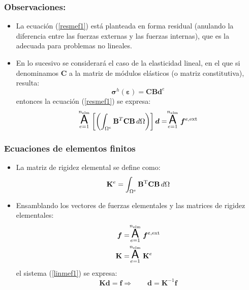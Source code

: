 \documentclass[handout]{beamer}
\begin{document}
\begin{frame}
\frametitle{Observaciones:}
\begin{itemize}
\item La ecuación (\ref{resmef1}) está planteada en forma
residual (anulando la diferencia entre las fuerzas externas y las fuerzas
internas), que es la adecuada para problemas no lineales.
\item En lo sucesivo se considerará el caso de la elasticidad lineal, en el
que si denominamos $\mathbf{C}$ a la matriz de módulos elásticos 
(o matriz constitutiva), resulta:
\begin{equation}
\bm{\sigma}^h(\bm{\varepsilon})=
\mathbf{C} \mathbf{B}\bm{d}^e
\end{equation}
entonces la ecuación (\ref{resmef1}) se expresa:
\begin{equation}
\stackrel{n_{\textrm{elm}}}{\underset{e=1}{\mbox{\LARGE{\bf {\sf A}}}}} \left[
\left(\int_{\Omega^e} \mathbf{B}^T \mathbf{C} \mathbf{B} \, d \Omega \right)
\right]\bm{d}=
\stackrel{n_{\textrm{elm}}}{\underset{e=1}{\mbox{\LARGE{\bf {\sf A}}}}}
\bm{f}^{e,\textrm{ext}} \label{linmef1}
\end{equation}
\end{itemize}
\end{frame}
\begin{frame}
\frametitle{Ecuaciones de elementos finitos}
\begin{itemize}
\item La matriz de rigidez elemental se define como:
\begin{equation}
\mathbf{K}^{e}=
\int_{\Omega^{e}} \mathbf{B}^{\rm T}  \mathbf{C}
\mathbf{B} \, d \Omega \label{arrc}
\end{equation}
\item Ensamblando los vectores de fuerzas elementales y las matrices de
rigidez elementales:
\begin{align}
\bm{f}&=\stackrel{n_{\textrm{elm}}}{\underset{e=1}{\mbox{\LARGE{\bf {\sf A}}}}}
\bm{f}^{e,\textrm{ext}} \\
\mathbf{K}&=\stackrel{n_{\textrm{elm}}}{\underset{e=1}{\mbox{\LARGE{\bf {\sf A}}}}} \mathbf{K}^{e}
\end{align}
el sistema (\ref{linmef1}) se expresa:
\begin{equation}
\mathbf{K} \bm{d}=\bm{f} \Rightarrow \qquad \bm{d}=\mathbf{K}^{-1} \bm{f}
\end{equation}
\end{itemize}
\end{frame}
\end{document}
